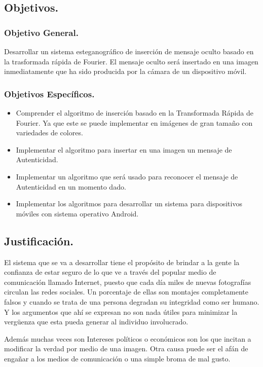 \documentclass[12pt]{article}
\begin{document}
\subsection{Objetivos.}
\subsubsection{Objetivo General.}
Desarrollar un sistema esteganográfico de inserción de mensaje oculto basado en la trasformada rápida de Fourier. El mensaje oculto será insertado en una imagen inmediatamente que ha sido producida por la cámara de un dispositivo móvil.

\subsubsection{Objetivos Específicos.}
\begin{itemize}
\item Comprender el algoritmo de inserción basado en la Transformada Rápida de Fourier. Ya que este se puede implementar en imágenes de gran tamaño con variedades de colores.
\item Implementar el algoritmo para insertar en una imagen un mensaje de Autenticidad.
\item Implementar un algoritmo que será usado para reconocer el mensaje de Autenticidad en un momento dado.
\item Implementar los algoritmos para desarrollar un sistema para dispositivos  móviles con sistema operativo Android.
\end{itemize}

\subsection{Justificación.}
El sistema que se va a desarrollar tiene el propósito de brindar a  la gente la confianza de estar seguro de lo que ve a través del popular medio de comunicación llamado Internet, puesto que cada día miles de nuevas fotografías circulan las redes sociales. Un porcentaje de ellas son montajes completamente falsos y cuando se trata de una persona degradan su integridad como ser humano. Y los argumentos que ahí se expresan no son nada útiles para minimizar la vergüenza que esta pueda generar al individuo involucrado.

Además muchas veces son Intereses políticos o económicos son los que incitan a modificar la verdad por medio de una imagen. Otra causa puede ser el afán de engañar a los medios de comunicación o una simple broma de mal gusto.
\end{document}
